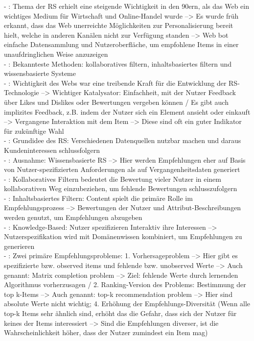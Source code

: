 \newpage
- \cite[S. xvii]{recommenderSystems:2016}: Thema der RS erhielt eine steigende Wichtigkeit in den 90ern, als das Web ein wichtiges Medium für Wirtschaft und Online-Handel wurde --> Es wurde früh erkannt, dass das Web unerreichte Möglichkeiten zur Personalisierung bereit hielt, welche in anderen Kanälen nicht zur Verfügung standen --> Web bot einfache Datensammlung und Nutzeroberfläche, um empfohlene Items in einer unaufdringlichen Weise anzuzeigen\\
- \cite[S. xvii]{recommenderSystems:2016}: Bekannteste Methoden: kollaboratives filtern, inhaltsbasiertes filtern und wissensbasierte Systeme\\
- \cite[S. 1]{recommenderSystems:2016}: Wichtigkeit des Webs war eine treibende Kraft für die Entwicklung der RS-Technologie --> Wichtiger Katalysator: Einfachheit, mit der Nutzer Feedback über Likes und Dislikes oder Bewertungen vergeben können / Es gibt auch implizites Feedback, z.B. indem der Nutzer sich ein Element ansieht oder einkauft --> Vergangene Interaktion mit dem Item --> Diese sind oft ein guter Indikator für zukünftige Wahl\\
- \cite[S. 1]{recommenderSystems:2016}: Grundidee des RS: Verschiedenen Datenquellen nutzbar machen und daraus Kundeninteressen schlussfolgern\\
- \cite[S. 1f.]{recommenderSystems:2016}: Ausnahme: Wissensbasierte RS --> Hier werden Empfehlungen eher auf Basis von Nutzer-spezifizierten Anforderungen als auf Vergangenheitsdaten generiert\\
- \cite[S. 2]{recommenderSystems:2016}: Kollaboratives Filtern bedeutet die Bewertung vieler Nutzer in einem kollaborativen Weg einzubeziehen, um fehlende Bewertungen schlusszufolgern\\
- \cite[S. 2]{recommenderSystems:2016}: Inhaltsbasiertes Filtern: Content spielt die primäre Rolle im Empfehlungsprozess --> Bewertungen der Nutzer und Attribut-Beschreibungen werden genutzt, um Empfehlungen abzugeben\\
- \cite[S. 2]{recommenderSystems:2016}: Knowledge-Based: Nutzer spezifizieren Interaktiv ihre Interessen --> Nutzerspezifikation wird mit Domänenwissen kombiniert, um Empfehlungen zu generieren\\
- \cite[S. 3]{recommenderSystems:2016}: Zwei primäre Empfehlungsprobleme: 1. Vorhersageproblem --> Hier gibt es spezifizierte bzw. observed items und fehlende bzw. unobserved Werte --> Auch genannt: Matrix completion problem --> Ziel: fehlende Werte durch lernenden Algorithmus vorherzusagen / 2. Ranking-Version des Problems: Bestimmung der top k-Items --> Auch genannt: top-k recommendation problem --> Hier sind absolute Werte nicht wichtig; 4. Erhöhung der Empfehlungs-Diversität (Wenn alle top-k Items sehr ähnlich sind, erhöht das die Gefahr, dass sich der Nutzer für keines der Items interessiert --> Sind die Empfehlungen diverser, ist die Wahrscheinlichkeit höher, dass der Nutzer zumindest ein Item mag)\\
